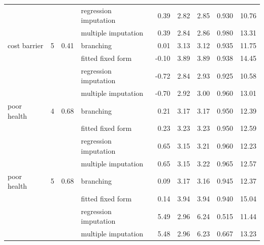 \begin{table}[h]
\begin{tabular}{lrrlrrrrr}
 &  &  & regression imputation & 0.39 & 2.82 & 2.85 & 0.930 & 10.76 \\
 &  &  & multiple imputation & 0.39 & 2.84 & 2.86 & 0.980 & 13.31 \\
cost barrier & 5 & 0.41 & branching & 0.01 & 3.13 & 3.12 & 0.935 & 11.75 \\
 &  &  & fitted fixed form & -0.10 & 3.89 & 3.89 & 0.938 & 14.45 \\
 &  &  & regression imputation & -0.72 & 2.84 & 2.93 & 0.925 & 10.58 \\
 &  &  & multiple imputation & -0.70 & 2.92 & 3.00 & 0.960 & 13.01 \\
poor health & 4 & 0.68 & branching & 0.21 & 3.17 & 3.17 & 0.950 & 12.39 \\
 &  &  & fitted fixed form & 0.23 & 3.23 & 3.23 & 0.950 & 12.59 \\
 &  &  & regression imputation & 0.65 & 3.15 & 3.21 & 0.960 & 12.23 \\
 &  &  & multiple imputation & 0.65 & 3.15 & 3.22 & 0.965 & 12.57 \\
poor health & 5 & 0.68 & branching & 0.09 & 3.17 & 3.16 & 0.945 & 12.37 \\
 &  &  & fitted fixed form & 0.14 & 3.94 & 3.94 & 0.940 & 15.04 \\
 &  &  & regression imputation & 5.49 & 2.96 & 6.24 & 0.515 & 11.44 \\
 &  &  & multiple imputation & 5.48 & 2.96 & 6.23 & 0.667 & 13.23 \\
\bottomrule
\end{tabular}
\end{table}
